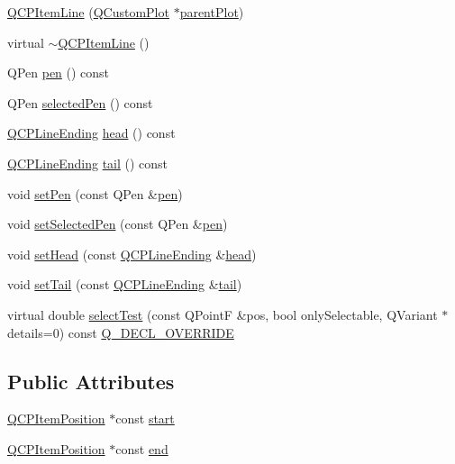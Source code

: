 \begin{DoxyCompactItemize}
\item 
\hyperlink{class_q_c_p_item_line_a17804b7f64961c6accf25b61e85142e3}{Q\+C\+P\+Item\+Line} (\hyperlink{class_q_custom_plot}{Q\+Custom\+Plot} $\ast$\hyperlink{class_q_c_p_layerable_a473edb813a4c1929d6b6a8fe3ff3faf7}{parent\+Plot})
\item 
virtual \hyperlink{class_q_c_p_item_line_a94b5aaae048171e5306dc4695b991283}{$\sim$\+Q\+C\+P\+Item\+Line} ()
\item 
Q\+Pen \hyperlink{class_q_c_p_item_line_a712e5a7f59db3f4c588dfc370a63e225}{pen} () const
\item 
Q\+Pen \hyperlink{class_q_c_p_item_line_ae1782c4fbecd38054ec3d49d8572a5e5}{selected\+Pen} () const
\item 
\hyperlink{class_q_c_p_line_ending}{Q\+C\+P\+Line\+Ending} \hyperlink{class_q_c_p_item_line_a6cdc9e87e17418d4b0e66eaa0f041407}{head} () const
\item 
\hyperlink{class_q_c_p_line_ending}{Q\+C\+P\+Line\+Ending} \hyperlink{class_q_c_p_item_line_ac085d3939ec11d7a4d592dc2ed578360}{tail} () const
\item 
void \hyperlink{class_q_c_p_item_line_a572528dab61c1abe205822fbd5db4b27}{set\+Pen} (const Q\+Pen \&\hyperlink{class_q_c_p_item_line_a712e5a7f59db3f4c588dfc370a63e225}{pen})
\item 
void \hyperlink{class_q_c_p_item_line_a3e2fec44503277e77717e9c24f87f1ea}{set\+Selected\+Pen} (const Q\+Pen \&\hyperlink{class_q_c_p_item_line_a712e5a7f59db3f4c588dfc370a63e225}{pen})
\item 
void \hyperlink{class_q_c_p_item_line_aebf3d687114d584e0459db6759e2c3c3}{set\+Head} (const \hyperlink{class_q_c_p_line_ending}{Q\+C\+P\+Line\+Ending} \&\hyperlink{class_q_c_p_item_line_a6cdc9e87e17418d4b0e66eaa0f041407}{head})
\item 
void \hyperlink{class_q_c_p_item_line_ac264222c3297a7efe33df9345c811a5f}{set\+Tail} (const \hyperlink{class_q_c_p_line_ending}{Q\+C\+P\+Line\+Ending} \&\hyperlink{class_q_c_p_item_line_ac085d3939ec11d7a4d592dc2ed578360}{tail})
\item 
virtual double \hyperlink{class_q_c_p_item_line_a8e02bfbca04fbcf3dbc375a2bf693229}{select\+Test} (const Q\+PointF \&pos, bool only\+Selectable, Q\+Variant $\ast$details=0) const \hyperlink{qcustomplot_8h_a42cc5eaeb25b85f8b52d2a4b94c56f55}{Q\+\_\+\+D\+E\+C\+L\+\_\+\+O\+V\+E\+R\+R\+I\+DE}
\end{DoxyCompactItemize}
\subsection*{Public Attributes}
\begin{DoxyCompactItemize}
\item 
\hyperlink{class_q_c_p_item_position}{Q\+C\+P\+Item\+Position} $\ast$const \hyperlink{class_q_c_p_item_line_a602da607a09498b0f152ada1d6851bc5}{start}
\item 
\hyperlink{class_q_c_p_item_position}{Q\+C\+P\+Item\+Position} $\ast$const \hyperlink{class_q_c_p_item_line_a15598864c1c22a2497a1979c4980c4e1}{end}
\end{DoxyCompactItemize}
